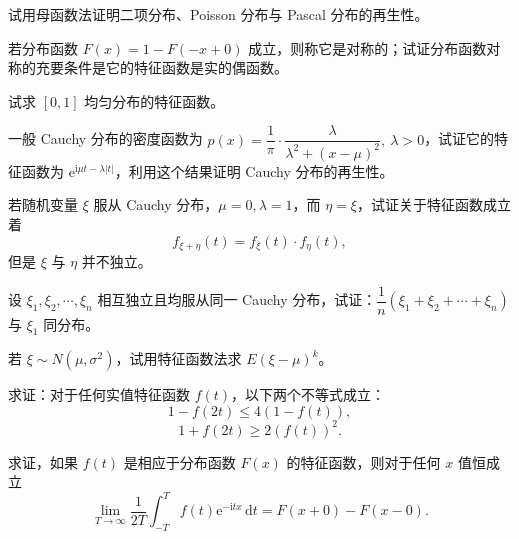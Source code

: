 \documentclass[../../main.tex]{subfiles}
\begin{document}
\begin{exercise}\label{exercise:ch04-46}
试用母函数法证明二项分布、Poisson 分布与 Pascal 分布的再生性。
\end{exercise}

\begin{exercise}\label{exercise:ch04-47}
若分布函数 $F(x)=1-F(-x+0)$ 成立，则称它是对称的；试证分布函数对称的充要条件是它的特征函数是实的偶函数。
\end{exercise}

\begin{exercise}\label{exercise:ch04-48}
试求 $[0,1]$ 均匀分布的特征函数。
\end{exercise}

\begin{exercise}\label{exercise:ch04-49}
一般 Cauchy 分布的密度函数为 $p(x)=\dfrac{1}{\pi}\cdot\dfrac{\lambda}{\lambda^2+(x-\mu)^2},\ \lambda>0$，试证它的特征函数为 $\mathrm{e}^{\mathrm{i}\mu t-\lambda|t|}$，利用这个结果证明 Cauchy 分布的再生性。
\end{exercise}

\begin{exercise}\label{exercise:ch04-50}
若随机变量 $\xi$ 服从 Cauchy 分布，$\mu=0,\lambda=1$，而 $\eta=\xi$，试证关于特征函数成立着
\[
f_{\xi+\eta}(t)=f_{\xi}(t)\cdot f_{\eta}(t),
\]
但是 $\xi$ 与 $\eta$ 并不独立。
\end{exercise}

\begin{exercise}\label{exercise:ch04-51}
设 $\xi_1,\xi_2,\cdots,\xi_n$ 相互独立且均服从同一 Cauchy 分布，试证：$\dfrac{1}{n}(\xi_1+\xi_2+\cdots+\xi_n)$ 与 $\xi_1$ 同分布。
\end{exercise}

\begin{exercise}\label{exercise:ch04-52}
若 $\xi\sim N(\mu,\sigma^2)$，试用特征函数法求 $E(\xi-\mu)^k$。
\end{exercise}

\begin{exercise}\label{exercise:ch04-53}
求证：对于任何实值特征函数 $f(t)$，以下两个不等式成立：
\[
1-f(2t)\leqslant 4(1-f(t)),
\]
\[
1+f(2t)\geqslant 2(f(t))^2.
\]
\end{exercise}

\begin{exercise}\label{exercise:ch04-54}
求证，如果 $f(t)$ 是相应于分布函数 $F(x)$ 的特征函数，则对于任何 $x$ 值恒成立
\[
\lim_{T\to\infty}\frac{1}{2T}\int_{-T}^T f(t)\mathrm{e}^{-\mathrm{i}tx}\,\mathrm{d}t=F(x+0)-F(x-0).
\]
\end{exercise}
\end{document}
